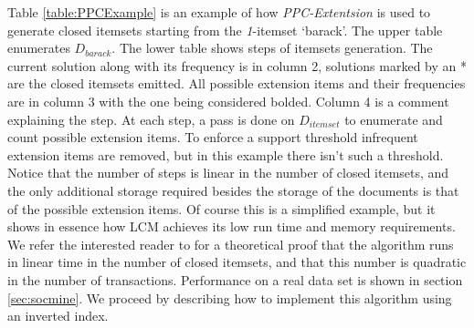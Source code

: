 \documentclass{sig-alternate}
\begin{document}


Table \ref{table:PPCExample} is an example of how \emph{PPC-Extentsion} is used to generate closed itemsets starting from the  \emph{1}-itemset `barack'. The upper table enumerates $D_{barack}$. %
The lower table shows steps of itemsets generation. The current solution along with its frequency is in column 2, solutions marked by an * are the closed itemsets emitted. All possible extension items and their frequencies are in column 3 with the one being considered bolded. Column 4 is a comment explaining the step. At each step, a pass is done on $D_{itemset}$ to enumerate and count possible extension items.
To enforce a support threshold infrequent extension items are removed, but in this example there isn't such a threshold. Notice that the number of steps is linear in the number of closed itemsets, and the only additional storage required besides the storage of the documents is that of the possible extension items. Of course this is a simplified example, but it shows in essence how LCM achieves its low run time and memory requirements. We refer the interested reader to \cite{lcm} for a theoretical proof that the algorithm runs in linear time in the number of closed itemsets, and that this number is quadratic in the number of transactions. Performance on a real data set is shown in section \ref{sec:socmine}. We proceed by describing how to implement this algorithm using an inverted index.

\end{document}

